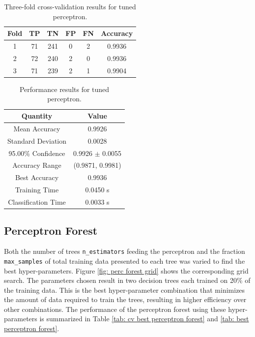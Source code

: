 \documentclass[paper=a4, fontsize=11pt]{scrartcl} %
\begin{document}
\begin{table}[H]
	\centering
	\caption{Three-fold cross-validation results for tuned perceptron.}
	\begin{tabular}{|c|c|c|c|c|c|}
		\hline
		\textbf{Fold} & \textbf{TP} & \textbf{TN} & \textbf{FP} & \textbf{FN} & \textbf{Accuracy} \\ \hline \hline
		1 & 71 & 241 & 0 & 2 & 0.9936  \\ \hline
		2 & 72 & 240 & 2 & 0 & 0.9936  \\ \hline
		3 & 71 & 239 & 2 & 1 & 0.9904  \\ \hline
	\end{tabular}
	\label{tab: cv best perceptron}
\end{table}

\begin{table}[H]
	\centering
	\caption{Performance results for tuned perceptron.}
	\begin{tabular}{|c|c|}
		\hline
		\textbf{Quantity}    & \textbf{Value}       \\ \hline \hline
		Mean Accuracy        & 0.9926 \\ \hline
		Standard Deviation   & 0.0028 \\ \hline
		95.00\% Confidence   & 0.9926 $\pm$ 0.0055 \\ \hline
		Accuracy Range       & (0.9871, 0.9981) \\ \hline
		Best Accuracy        & 0.9936 \\ \hline
		Training Time        & 0.0450 s\\ \hline
		Classification Time  & 0.0033 s \\ \hline
	\end{tabular}
	\label{tab: best perceptron}
\end{table}

\subsection*{Perceptron Forest}
Both the number of trees \verb|n_estimators| feeding the perceptron and the fraction \verb|max_samples| of total training data presented to each tree was varied to find the best hyper-parameters.
Figure \ref{fig: perc forest grid} shows the corresponding grid search.
The parameters chosen result in two decision trees each trained on 20\% of the training data.
This is the best hyper-parameter combination that minimizes the amount of data required to train the trees, resulting in higher efficiency over other combinations.
The performance of the perceptron forest using these hyper-parameters is summarized in Table \ref{tab: cv best perceptron forest} and \ref{tab: best perceptron forest}.
\end{document}

